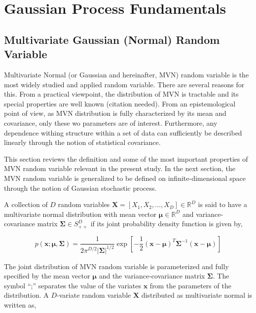 \section{Gaussian Process Fundamentals}\label{sec:gp_fundamentals}

\subsection[Multivariate Normal Random Variable]{Multivariate Gaussian (Normal) Random Variable}\label{sub:gp_mvn}

Multivariate Normal (or Gaussian and hereinafter, \textsc{MVN}) random variable is the most widely studied and applied random variable.
There are several reasons for this.
From a practical viewpoint, 
the distribution of MVN is tractable and 
its special properties are well known (citation needed).
From an epistemological point of view, as MVN distribution is fully characterized by its mean and covariance, only these wo parameters are of interest.
Furthermore, any dependence withing structure within a set of data can sufficiently be described linearly through the notion of statistical covariance.

This section reviews the definition and some of the most important properties of MVN random variable relevant in the present study.
In the next section, the MVN random variable is generalized to be defined on infinite-dimensional space through the notion of Gaussian stochastic process.

A collection of $D$ random variables $\mathbf{X} = [X_1, X_2, ...,X_D] \in \mathbb{R}^D$ is said to have a multivariate normal distribution with mean vector $\boldsymbol{\mu} \in \mathbb{R}^D$ and variance-covariance matrix $\boldsymbol{\Sigma} \in S_{++}^D$ if its joint probability density function is given by,

\begin{equation}
p(\mathbf{x};\boldsymbol{\mu},\boldsymbol{\Sigma}) = \frac{1}{2\pi^{D/2}|\boldsymbol{\Sigma}|^{1/2}} \exp{\left[-\frac{1}{2}(\boldsymbol{x}-\boldsymbol{\mu})^T\boldsymbol{\Sigma}^{-1}(\boldsymbol{x}-\boldsymbol{\mu})\right]}
\end{equation}

The joint distribution of MVN random variable is parameterized and fully specified by the mean vector $\boldsymbol{\mu}$ and the variance-covariance matrix $\boldsymbol{\Sigma}$. The symbol ``;'' separates the value of the variates $\boldsymbol{x}$ from the parameters of the distribution. 
A $D$-variate random variable $\boldsymbol{X}$ distributed as multivariate normal is written as,

